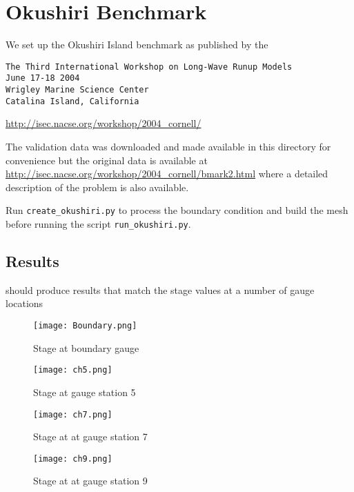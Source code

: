 
\section{Okushiri Benchmark}

We set up the Okushiri Island benchmark as published by the
\begin{verbatim}
The Third International Workshop on Long-Wave Runup Models
June 17-18 2004
Wrigley Marine Science Center
Catalina Island, California
\end{verbatim}
\url{http://isec.nacse.org/workshop/2004_cornell/}


The validation data was downloaded and made available in this directory
for convenience but the original data is available at
\url{http://isec.nacse.org/workshop/2004_cornell/bmark2.html}
where a detailed description of the problem is also available.


Run \verb|create_okushiri.py| to process the boundary condition and build the
mesh before running the script \verb|run_okushiri.py|.

\subsection{Results}

\anuga{} should produce results that match the stage values at a number of gauge locations



\begin{figure}[h]
\begin{center}
\texttt{[image: Boundary.png]}
\end{center}
\caption{Stage at boundary gauge}
\label{okushiri:boundary}
\end{figure}



\begin{figure}[h]
\begin{center}
\texttt{[image: ch5.png]}
\end{center}
\caption{Stage at gauge station 5}
\label{okushiri:ch:five}
\end{figure}

\begin{figure}[h]
\begin{center}
\texttt{[image: ch7.png]}
\end{center}
\caption{Stage at at gauge station 7}
\label{okushiri:ch_seven}
\end{figure}

\begin{figure}[h]
\begin{center}
\texttt{[image: ch9.png]}
\end{center}
\caption{Stage at at gauge station 9}
\label{okushiri:ch_nine}
\end{figure}




\endinput